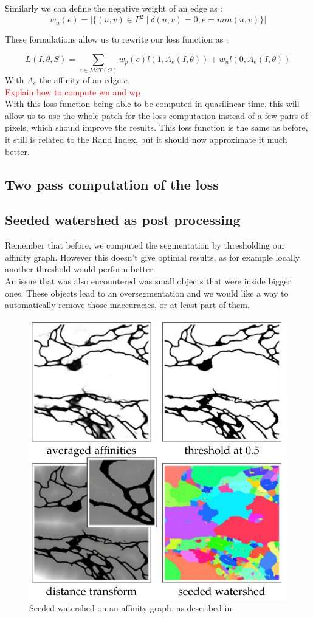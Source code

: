 Similarly we can define the negative weight of an edge as :
\begin{equation*}
	w_n(e)=\lvert \{(u,v)\in F^2 \;|\;\delta(u,v)=0, e=mm(u,v) \}   \rvert
\end{equation*}

These formulations allow us to rewrite our loss function as :

\begin{equation*}
	L(I,\theta,S) = \sum_{e\in MST(G)} w_p(e)l(1,A_e(I,\theta)) + w_nl(0,A_e(I,\theta))
\end{equation*}
With $A_e$ the affinity of an edge $e$.\\

\textcolor{red}{Explain how to compute wn and wp}
\\

With this loss function being able to be computed in quasilinear time, this
will allow us to use the whole patch for the loss computation instead of a few
pairs of pixels, which should improve the results. This loss function is the
same as before, it still is related to the Rand Index, but it should now
approximate it much better.\\

\subsection{Two pass computation of the loss}


\subsection{Seeded watershed as post processing}

Remember that before, we computed the segmentation by thresholding our affinity
graph. However this doesn't give optimal results, as for example locally
another threshold would perform better.\\
An issue that was also encountered was small objects that were inside bigger
ones. These objects lead to an oversegmentation and we would like a way to
automatically remove those inaccuracies, or at least part of them.

\begin{figure}[!htbp]
	\centering
	\includegraphics[width=0.5\linewidth]{./images/mala_post_proc.png}
	\caption{Seeded watershed on an affinity graph, as described in~\cite{funke_large_2019}}%
	\label{fig:seeded_ws}
\end{figure}

